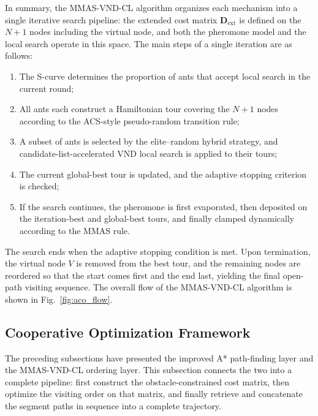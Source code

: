 \documentclass[lettersize,journal]{IEEEtran}
\begin{document}
In summary, the MMAS-VND-CL algorithm organizes each mechanism into a single iterative search pipeline: the extended cost matrix $\mathbf{D}_{\mathrm{ext}}$ is defined on the $N+1$ nodes including the virtual node, and both the pheromone model and the local search operate in this space. The main steps of a single iteration are as follows:
\begin{enumerate}
\item The S-curve determines the proportion of ants that accept local search in the current round;
\item All ants each construct a Hamiltonian tour covering the $N+1$ nodes according to the ACS-style pseudo-random transition rule;
\item A subset of ants is selected by the elite--random hybrid strategy, and candidate-list-accelerated VND local search is applied to their tours;
\item The current global-best tour is updated, and the adaptive stopping criterion is checked;
\item If the search continues, the pheromone is first evaporated, then deposited on the iteration-best and global-best tours, and finally clamped dynamically according to the MMAS rule.
\end{enumerate}
The search ends when the adaptive stopping condition is met. Upon termination, the virtual node $V$ is removed from the best tour, and the remaining nodes are reordered so that the start comes first and the end last, yielding the final open-path visiting sequence. The overall flow of the MMAS-VND-CL algorithm is shown in Fig.~\textcolor{blue}{\ref{fig:aco_flow}}.

\subsection{Cooperative Optimization Framework}
\label{subsec:coop}

The preceding subsections have presented the improved A* path-finding layer and the MMAS-VND-CL ordering layer. This subsection connects the two into a complete pipeline: first construct the obstacle-constrained cost matrix, then optimize the visiting order on that matrix, and finally retrieve and concatenate the segment paths in sequence into a complete trajectory.
\end{document}
